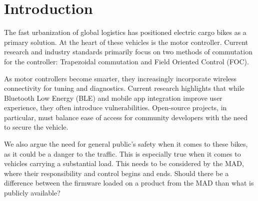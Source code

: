 \section{Introduction}
The fast urbanization of global logistics has positioned electric cargo bikes as a primary solution. At the heart of these vehicles is the motor controller. Current research and industry standards primarily focus on two methods of commutation for the controller: Trapezoidal commutation and Field Oriented Control (FOC).

As motor controllers become smarter, they increasingly incorporate wireless connectivity for tuning and diagnostics. Current research highlights that while Bluetooth Low Energy (BLE) and mobile app integration improve user experience, they often introduce vulnerabilities. Open-source projects, in particular, must balance ease of access for community developers with the need to secure the vehicle.

We also argue the need for general public's safety when it comes to these bikes, as it could be a danger to the traffic. This is especially true when it comes to vehicles carrying a substantial load. This needs to be considered by the MAD, where their responsibility and control begins and ends. Should there be a difference between the firmware loaded on a product from the MAD than what is publicly available?




